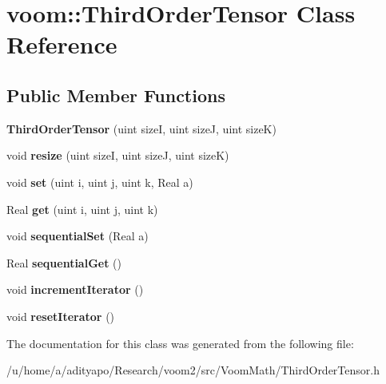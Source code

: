 \hypertarget{classvoom_1_1_third_order_tensor}{
\section{voom::ThirdOrderTensor Class Reference}
\label{classvoom_1_1_third_order_tensor}
}
\subsection*{Public Member Functions}
\begin{DoxyCompactItemize}
\item 
\hypertarget{classvoom_1_1_third_order_tensor_a12696b5c439afe17db64a0aadc53589e}{
{\bfseries ThirdOrderTensor} (uint sizeI, uint sizeJ, uint sizeK)}
\label{classvoom_1_1_third_order_tensor_a12696b5c439afe17db64a0aadc53589e}

\item 
\hypertarget{classvoom_1_1_third_order_tensor_aa28ef3ba14892c0bc55a63658b802b78}{
void {\bfseries resize} (uint sizeI, uint sizeJ, uint sizeK)}
\label{classvoom_1_1_third_order_tensor_aa28ef3ba14892c0bc55a63658b802b78}

\item 
\hypertarget{classvoom_1_1_third_order_tensor_a1bdd0a1c84c46a7cc41ef9ede607bb9d}{
void {\bfseries set} (uint i, uint j, uint k, Real a)}
\label{classvoom_1_1_third_order_tensor_a1bdd0a1c84c46a7cc41ef9ede607bb9d}

\item 
\hypertarget{classvoom_1_1_third_order_tensor_a5d16ec7a14cfb36f8e2d1a9b49fa366f}{
Real {\bfseries get} (uint i, uint j, uint k)}
\label{classvoom_1_1_third_order_tensor_a5d16ec7a14cfb36f8e2d1a9b49fa366f}

\item 
\hypertarget{classvoom_1_1_third_order_tensor_ad83f78a740f9420e7515fb004434724e}{
void {\bfseries sequentialSet} (Real a)}
\label{classvoom_1_1_third_order_tensor_ad83f78a740f9420e7515fb004434724e}

\item 
\hypertarget{classvoom_1_1_third_order_tensor_a8bd25cbcbbea8fa5aff5335faaea3213}{
Real {\bfseries sequentialGet} ()}
\label{classvoom_1_1_third_order_tensor_a8bd25cbcbbea8fa5aff5335faaea3213}

\item 
\hypertarget{classvoom_1_1_third_order_tensor_ab3bd9676e0c91c05d831e1ead4a21da5}{
void {\bfseries incrementIterator} ()}
\label{classvoom_1_1_third_order_tensor_ab3bd9676e0c91c05d831e1ead4a21da5}

\item 
\hypertarget{classvoom_1_1_third_order_tensor_a2c6a041c88f86f0c6b30f870af178624}{
void {\bfseries resetIterator} ()}
\label{classvoom_1_1_third_order_tensor_a2c6a041c88f86f0c6b30f870af178624}

\end{DoxyCompactItemize}


The documentation for this class was generated from the following file:\begin{DoxyCompactItemize}
\item 
/u/home/a/adityapo/Research/voom2/src/VoomMath/ThirdOrderTensor.h\end{DoxyCompactItemize}
